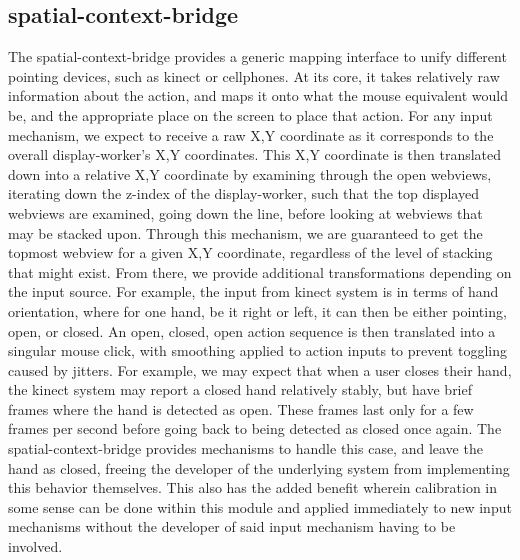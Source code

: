 \subsection{spatial-context-bridge}


The spatial-context-bridge provides a generic mapping interface to unify different pointing
devices, such as kinect or cellphones. At its core, it takes relatively raw information about
the action, and maps it onto what the mouse equivalent would be, and the appropriate place
on the screen to place that action. For any input mechanism, we expect to receive a raw
X,Y coordinate as it corresponds to the overall display-worker's X,Y coordinates. This X,Y
coordinate is then translated down into a relative X,Y coordinate by examining through the
open webviews, iterating down the z-index of the display-worker, such that the top displayed
webviews are examined, going down the line, before looking at webviews that may be stacked
upon. Through this mechanism, we are guaranteed to get the topmost webview for a given X,Y
coordinate, regardless of the level of stacking that might exist. From there, we provide
additional transformations depending on the input source. For example, the input from
kinect system is in terms of hand orientation, where for one hand, be it right or left, it
can then be either pointing, open, or closed. An open, closed, open action sequence is
then translated into a singular mouse click, with smoothing applied to action inputs to
prevent toggling caused by jitters. For example, we may expect that when a user closes
their hand, the kinect system may report a closed hand relatively stably, but have brief
frames where the hand is detected as open. These frames last only for a few frames per
second before going back to being detected as closed once again. The spatial-context-bridge
provides mechanisms to handle this case, and leave the hand as closed, freeing the
developer of the underlying system from implementing this behavior themselves. This also
has the added benefit wherein calibration in some sense can be done within this module
and applied immediately to new input mechanisms without the developer of said input
mechanism having to be involved.
